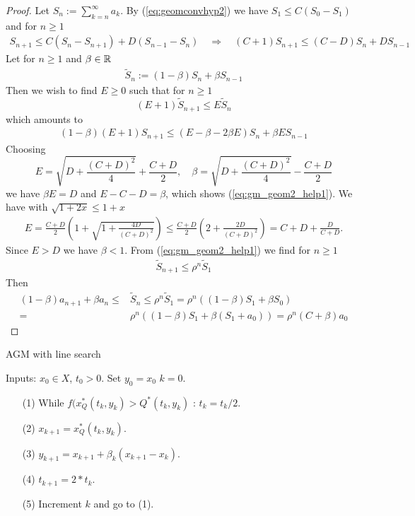 \documentclass[english,12pt,a4paper]{article}
\begin{document}
\begin{proof}
Let $S_n := \sum_{k=n}^{\infty} a_k$. By (\ref{eq:geomconvhyp2}) we have $S_1\le C (S_0-S_1)$ and for $n\ge1$
%
\begin{align*}
S_{n+1} \le C\left( S_{n}-S_{n+1}\right) + D\left( S_{n-1}-S_{n}\right)\quad\Rightarrow\quad 
(C+1) S_{n+1} \le (C-D)S_{n}+ D S_{n-1}
\end{align*}
%
Let for $n\ge1$ and $\beta\in\mathbb R$
%
\begin{align*}
\widetilde{S}_n := (1-\beta) S_n + \beta S_{n-1}
\end{align*}
%
Then we wish to find $E\ge0$ such that for $n\ge1$
%
\begin{equation}\label{eq:gm_geom2_help1}
(E+1) \widetilde{S}_{n+1} \le E \widetilde{S}_n 
\end{equation}
%
which amounts to
%
\begin{align*}
(1-\beta)(E+1) S_{n+1}  \le (E-\beta -2\beta E) S_n + \beta E S_{n-1}
\end{align*}
%
Choosing
%
\begin{equation}\label{eq:gm_geom2_help2}
E= \sqrt{D + \frac{(C+D)^2}{4}}+ \frac{C+D}{2},\quad
\beta  =\sqrt{D + \frac{(C+D)^2}{4}}-\frac{C+D}{2}
\end{equation}
%
we have $\beta E=D$ and $E-C-D=\beta$, which shows (\ref{eq:gm_geom2_help1}). We have with $\sqrt{1+2x}\le 1+x$
%
\begin{align*}
E= \frac{C+D}{2}\left(1+\sqrt{1+\frac{4D}{(C+D)^2}}\right)\le \frac{C+D}{2}\left( 2 + \frac{2D}{(C+D)^2}\right)
= C+D + \frac{D}{C+D}.
\end{align*}
%
Since $E>D$ we have $\beta<1$. From (\ref{eq:gm_geom2_help1}) we find for $n\ge 1$
%
\begin{align*}
\widetilde{S}_{n+1} \le \rho^n \widetilde{S}_1 
\end{align*}
%
Then
%
\begin{align*}
(1-\beta) a_{n+1} + \beta a_{n} \le& \widetilde{S}_{n} \le \rho^n \widetilde{S}_1 =
 \rho^n \left( (1-\beta) S_1 + \beta S_{0}\right)\\
=& \rho^n \left( (1-\beta) S_1 + \beta (S_{1}+a_0)\right)
= \rho^n(C+\beta) a_0
\end{align*}
%

\end{proof}

%
\begin{yellow}
\begin{algorithm}[H]
\caption{AGM with line search} 
\label{algorithm:Descent} 
%
Inputs: $x_0\in X$, $t_0>0$. Set $y_0=x_0$ $k=0$.
%
\begin{itemize}
\item[(1)] While $f(x^*_Q(t_k,y_k) > Q^*(t_k, y_k)$ : $t_k = t_k/2$.
\item[(2)] $x_{k+1} = x^*_Q(t_k,y_k)$.
\item[(3)] $y_{k+1} = x_{k+1} + \beta_k (x_{k+1}-x_{k})$.
\item[(4)] $t_{k+1} = 2*t_k$.
\item[(5)] Increment $k$ and go to (1).
\end{itemize}
%
\end{algorithm}
\end{yellow}
\end{document}

